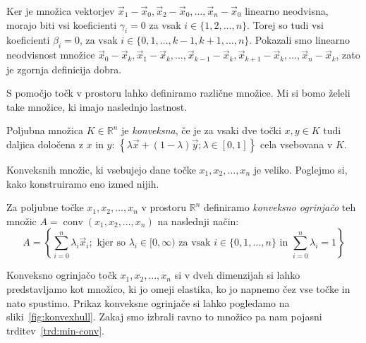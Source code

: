 \documentclass[mat1]{fmfdelo}
\newcommand{\R}{\mathbb R}
\DeclareMathOperator{\conv}{conv}
\newcommand{\0}{\underline{0}}
\begin{document}
Ker je množica vektorjev $\vec{x}_1 - \vec{x}_0, \vec{x}_2 - \vec{x}_0, \dots , \vec{x}_n - \vec{x}_0$ linearno neodvisna, morajo biti vsi koeficienti $\gamma_i = 0$ za vsak $i \in \{1, 2, \dots, n \}$. Torej so tudi vsi koeficienti $\beta_i = 0$, za vsak $i \in \{0, 1, \dots, k-1, k+1, \dots, n \}$. Pokazali smo linearno neodvisnost množice $\vec{x}_0 - \vec{x}_k, \vec{x}_1 - \vec{x}_k, \dots , \vec{x}_{k-1} - \vec{x}_k, \vec{x}_{k+1} - \vec{x}_k, \dots, \vec{x}_n - \vec{x}_k$, zato je zgornja definicija dobra. 

S pomočjo točk v prostoru lahko definiramo različne množice. Mi si bomo želeli take množice, ki imajo naslednjo lastnost.
\begin{definicija}
Poljubna množica $K \in \R^n$ je \emph{konveksna}, če je za vsaki dve točki $x, y \in K$ tudi daljica določena z $x$ in $y$: 
$\left \{ \lambda \vec{x} + (1 - \lambda) \vec{y}; \lambda \in  [0, 1] \right \}$ 
cela vsebovana v $K$.
\end{definicija}
Konveksnih množic, ki vsebujejo dane točke $x_1, x_2, \dots, x_n$ je veliko. Poglejmo si, kako konstruiramo eno izmed nijih.
\begin{definicija}
Za poljubne točke $x_1, x_2, \dots, x_n$ v prostoru $\R^n$ definiramo \emph{konveksno ogrinjačo} teh množic $A = \conv(x_1, x_2, \dots, x_n)$ na naslednji način:
$$A = \left \{ \sum\limits_{i=0}^n \lambda_i \vec{x}_i; \text{ kjer so } \lambda_i \in [0, \infty) \text{ za vsak } i \in \{0, 1, \dots, n \} \text{ in } \sum\limits_{i=0}^n \lambda_i = 1  \right \}$$
\end{definicija}
Konveksno ogrinjačo točk $x_1, x_2, \dots, x_n$ si v dveh dimenzijah si lahko predstavljamo kot množico, ki jo omeji elastika, ko jo napnemo čez vse točke in nato spustimo. Prikaz konveksne ogrinjače si lahko pogledamo na sliki~\ref{fig:konvexhull}. Zakaj smo izbrali ravno to množico pa nam pojasni trditev~\ref{trd:min-conv}.
\end{document}
